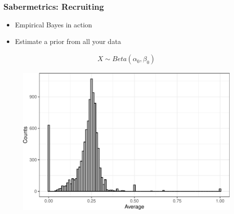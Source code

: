 \documentclass[
  shownotes,
  xcolor={svgnames},
  hyperref={colorlinks,citecolor=DarkBlue,linkcolor=DarkRed,urlcolor=DarkBlue}
  ]{beamer}
\begin{document}
\begin{frame}[fragile]
\frametitle{Sabermetrics: Recruiting}

\begin{itemize}
  \item Empirical Bayes in action
  \item Estimate a prior from all your data
\end{itemize}

\begin{align}
X \sim Beta(\alpha_0,\beta_0)
\end{align}



\begin{figure}[H] \centering
  \centering
  \includegraphics[scale=0.4]{figures/average_hist.pdf}
  \\
  \tiny 
\end{figure}



\end{frame}
\end{document}
